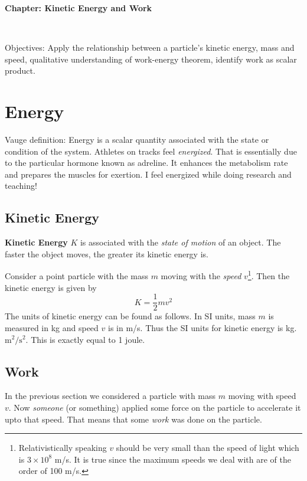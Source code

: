\documentclass[10pt]{article}
\date{2017-10-11}
\begin{document}
\begin{center}
\begin{Large}\textbf{Chapter: Kinetic Energy and Work}\end{Large} \\
\smallskip
\end{center}
Objectives: Apply the relationship between a particle's kinetic energy, mass and speed, qualitative understanding of work-energy theorem, identify work as scalar product. 
\section{Energy}
Vauge definition: Energy is a scalar quantity associated with the state or condition of the system. 
Athletes on tracks feel \emph{energized}. That is essentially due to the particular hormone known as adreline.  It enhances the metabolism rate and prepares the muscles for exertion.  I feel energized while doing research and teaching!


\subsection{Kinetic Energy}
\textbf{Kinetic Energy} $K$ is associated with the \emph{state of motion} of an object.  The faster the object moves, the greater its kinetic energy is.

Consider a  point particle with the mass $m$ moving with the \emph{speed} $v$\footnote{Relativistically speaking $v$ should be very small than the speed of light which is $3\times 10^8$ m/s.  It is true since the maximum speeds we deal with are of the order of 100 m/s.}.  Then the kinetic energy is given by
\begin{equation}
  K = \frac{1}{2}mv^2
\end{equation}
The units of kinetic energy can be found as follows.  In SI units, mass $m$ is measured in kg and speed $v$ is in m/s.  Thus the SI units for kinetic energy is kg.$\text{m}^2/\text{s}^2$.  This is exactly equal to 1 joule.

\subsection{Work}
In the previous section we considered a particle with mass $m$ moving with speed $v$.  Now \emph{someone} (or something) applied some force on the particle to accelerate it upto that speed.  That means that some \emph{work} was done on the particle. 
\end{document}
